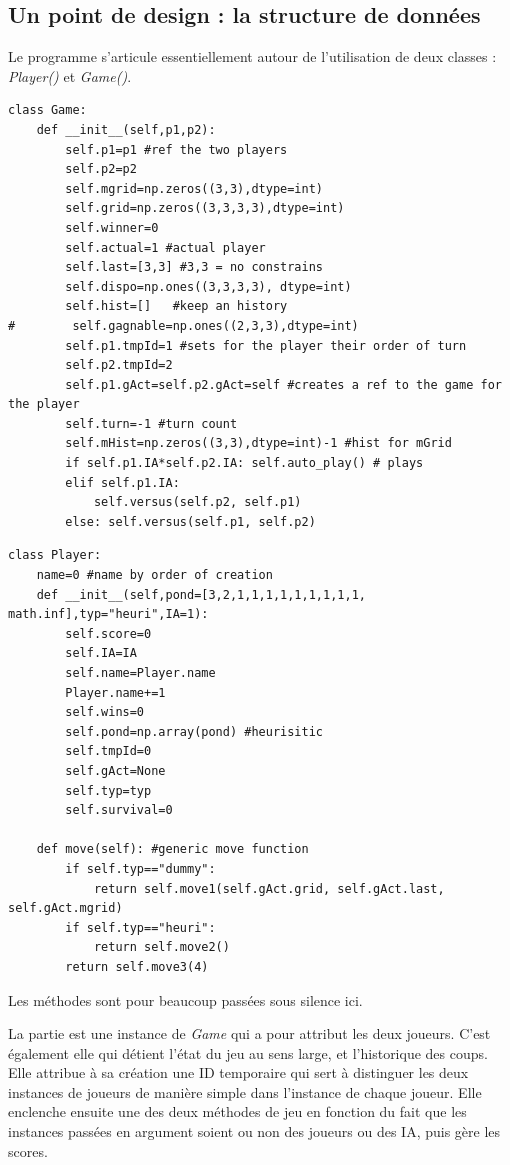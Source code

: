 \documentclass[10pt, french]{article}
\begin{document}
\subsection{Un point de design : la structure de données}
Le programme s'articule essentiellement autour de l'utilisation de deux classes : \emph{Player()} et 
\emph{Game()}.
\\
\begin{minipage}[]{.45\textwidth}
\begin{lstlisting}
class Game:
    def __init__(self,p1,p2):
        self.p1=p1 #ref the two players
        self.p2=p2
        self.mgrid=np.zeros((3,3),dtype=int) 
        self.grid=np.zeros((3,3,3,3),dtype=int)
        self.winner=0 
        self.actual=1 #actual player
        self.last=[3,3] #3,3 = no constrains
        self.dispo=np.ones((3,3,3,3), dtype=int)
        self.hist=[]   #keep an history
#        self.gagnable=np.ones((2,3,3),dtype=int)
        self.p1.tmpId=1 #sets for the player their order of turn
        self.p2.tmpId=2
        self.p1.gAct=self.p2.gAct=self #creates a ref to the game for the player
        self.turn=-1 #turn count
        self.mHist=np.zeros((3,3),dtype=int)-1 #hist for mGrid
        if self.p1.IA*self.p2.IA: self.auto_play() # plays
        elif self.p1.IA:
            self.versus(self.p2, self.p1)
        else: self.versus(self.p1, self.p2)
\end{lstlisting}
\end{minipage}
\begin{minipage}[]{.45\textwidth}
\begin{lstlisting}
class Player:
    name=0 #name by order of creation
    def __init__(self,pond=[3,2,1,1,1,1,1,1,1,1,1, math.inf],typ="heuri",IA=1):
        self.score=0 
        self.IA=IA
        self.name=Player.name
        Player.name+=1
        self.wins=0
        self.pond=np.array(pond) #heurisitic
        self.tmpId=0
        self.gAct=None
        self.typ=typ
        self.survival=0
       
    def move(self): #generic move function
        if self.typ=="dummy":
            return self.move1(self.gAct.grid, self.gAct.last, self.gAct.mgrid)
        if self.typ=="heuri":
            return self.move2()
        return self.move3(4)
\end{lstlisting}
\end{minipage}
\par Les méthodes sont pour beaucoup passées sous silence ici.
\par La partie est une instance de \emph{Game} qui a pour attribut les deux joueurs. C'est également elle qui détient l'état du jeu au sens large, et l'historique des coups. Elle attribue à sa création une ID temporaire qui sert à distinguer les deux instances de joueurs de manière simple dans l'instance de chaque joueur. Elle enclenche ensuite une des deux méthodes de jeu en fonction du fait que les instances passées en argument soient ou non des joueurs ou des IA, puis gère les scores.
\end{document}
